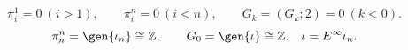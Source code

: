\begin{equation}\label{5.1}
\pi^{1}_{i}=0\ (i>1),\qquad
\pi^{n}_{i}=0\ (i<n),\qquad
G_k=(G_k;2)=0\ (k<0).
\end{equation}
\[
\pi^{n}_{n}=\gen{\iota_n}\cong \mathbb Z,\qquad
G_0=\gen{\iota}\cong \mathbb Z.\quad
\iota=E^{\infty}\iota_n.
\]
